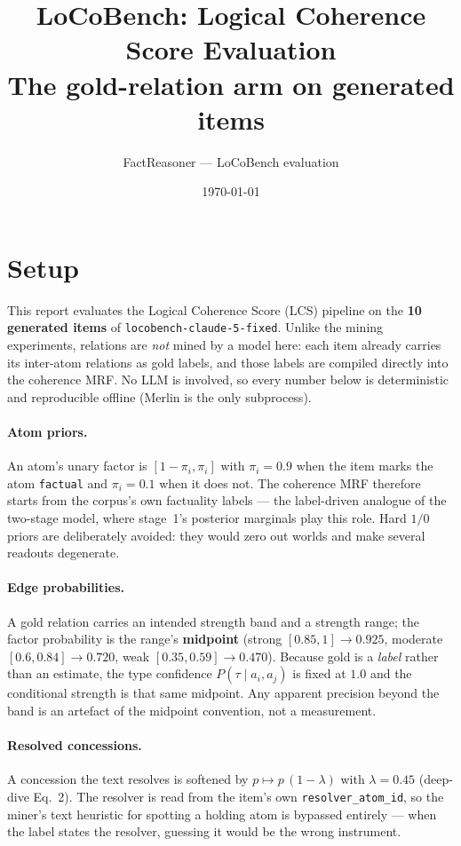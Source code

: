 \documentclass[11pt]{article}
\title{LoCoBench: Logical Coherence Score Evaluation\\
\large The gold-relation arm on generated items}
\author{FactReasoner --- LoCoBench evaluation}
\date{\today}
\begin{document}
\maketitle

\section{Setup}

This report evaluates the Logical Coherence Score (LCS) pipeline on the \textbf{10 generated items} of \texttt{locobench-claude-5-fixed}. Unlike the mining experiments, relations are \emph{not} mined by a model here: each item already carries its inter-atom relations as gold labels, and those labels are compiled directly into the coherence MRF. No LLM is involved, so every number below is deterministic and reproducible offline (Merlin is the only subprocess).

\paragraph{Atom priors.} An atom's unary factor is $[1-\pi_i, \pi_i]$ with $\pi_i = 0.9$ when the item marks the atom \texttt{factual} and $\pi_i = 0.1$ when it does not. The coherence MRF therefore starts from the corpus's own factuality labels --- the label-driven analogue of the two-stage model, where stage~1's posterior marginals play this role. Hard $1/0$ priors are deliberately avoided: they would zero out worlds and make several readouts degenerate.

\paragraph{Edge probabilities.} A gold relation carries an intended strength band and a strength range; the factor probability is the range's \textbf{midpoint} (strong $[0.85,1] \to 0.925$, moderate $[0.6,0.84] \to 0.720$, weak $[0.35,0.59] \to 0.470$). Because gold is a \emph{label} rather than an estimate, the type confidence $P(\tau \mid a_i,a_j)$ is fixed at $1.0$ and the conditional strength is that same midpoint. Any apparent precision beyond the band is an artefact of the midpoint convention, not a measurement.

\paragraph{Resolved concessions.} A concession the text resolves is softened by $p \mapsto p\,(1-\lambda)$ with $\lambda = 0.45$ (deep-dive Eq.~2). The resolver is read from the item's own \texttt{resolver\_atom\_id}, so the miner's text heuristic for spotting a holding atom is bypassed entirely --- when the label states the resolver, guessing it would be the wrong instrument.
\end{document}
